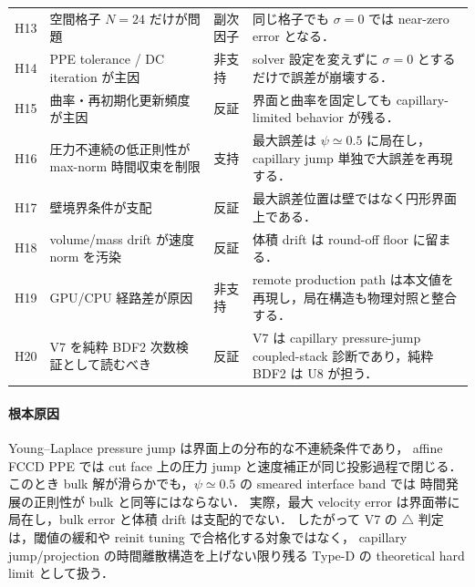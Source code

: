 \begin{table}[htbp]
\begin{tabularx}{\linewidth}{>{\raggedright\arraybackslash}p{9mm}X>{\raggedright\arraybackslash}p{23mm}X}
H13 & 空間格子 $N=24$ だけが問題 & 副次因子 &
同じ格子でも $\sigma=0$ では near-zero error となる．\\
H14 & PPE tolerance / DC iteration が主因 & 非支持 &
solver 設定を変えずに $\sigma=0$ とするだけで誤差が崩壊する．\\
H15 & 曲率・再初期化更新頻度が主因 & 反証 &
界面と曲率を固定しても capillary-limited behavior が残る．\\
H16 & 圧力不連続の低正則性が max-norm 時間収束を制限 & 支持 &
最大誤差は $\psi\simeq0.5$ に局在し，capillary jump 単独で大誤差を再現する．\\
H17 & 壁境界条件が支配 & 反証 &
最大誤差位置は壁ではなく円形界面上である．\\
H18 & volume/mass drift が速度 norm を汚染 & 反証 &
体積 drift は round-off floor に留まる．\\
H19 & GPU/CPU 経路差が原因 & 非支持 &
remote production path は本文値を再現し，局在構造も物理対照と整合する．\\
H20 & V7 を純粋 BDF2 次数検証として読むべき & 反証 &
V7 は capillary pressure-jump coupled-stack 診断であり，純粋 BDF2 は U8 が担う．\\
\bottomrule
\end{tabularx}
\end{table}

\paragraph{根本原因}

Young--Laplace pressure jump は界面上の分布的な不連続条件であり，
affine FCCD PPE では cut face 上の圧力 jump と速度補正が同じ投影過程で閉じる．
このとき bulk 解が滑らかでも，$\psi\simeq0.5$ の smeared interface band では
時間発展の正則性が bulk と同等にはならない．
実際，最大 velocity error は界面帯に局在し，bulk error と体積 drift は支配的でない．
したがって V7 の $\triangle$ 判定は，閾値の緩和や reinit tuning で合格化する対象ではなく，
capillary jump/projection の時間離散構造を上げない限り残る
Type-D の theoretical hard limit として扱う．
